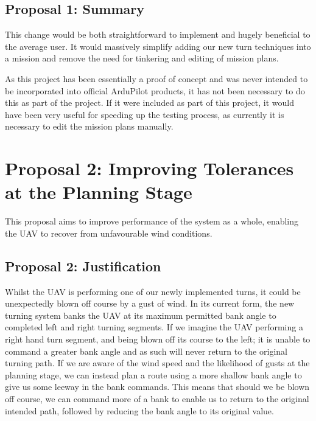 \subsection{Proposal 1: Summary}
\label{future:missionplannersummary}
This change would be both straightforward to implement and hugely beneficial to the average user. It would massively simplify adding our new turn techniques into a mission and remove the need for tinkering and editing of mission plans.

As this project has been essentially a proof of concept and was never intended to be incorporated into official ArduPilot products, it has not been necessary to do this as part of the project. If it were included as part of this project, it would have been very useful for speeding up the testing process, as currently it is necessary to edit the mission plans manually. 

\section{Proposal 2: Improving Tolerances at the Planning Stage} 
\label{future:tolerance}
This proposal aims to improve performance of the system as a whole, enabling the UAV to recover from unfavourable wind conditions.

\subsection{Proposal 2: Justification}
\label{future:tolerancereason}
Whilst the UAV is performing one of our newly implemented turns, it could be unexpectedly blown off course by a gust of wind. In its current form, the new turning system banks the UAV at its maximum permitted bank angle to completed left and right turning segments. If we imagine the UAV performing a right hand turn segment, and being blown off its course to the left; it is unable to command a greater bank angle and as such will never return to the original turning path. If we are aware of the wind speed and the likelihood of gusts at the planning stage, we can instead plan a route using a more shallow bank angle to give us some leeway in the bank commands. This means that should we be blown off course, we can command more of a bank to enable us to return to the original intended path, followed by reducing the bank angle to its original value. 

